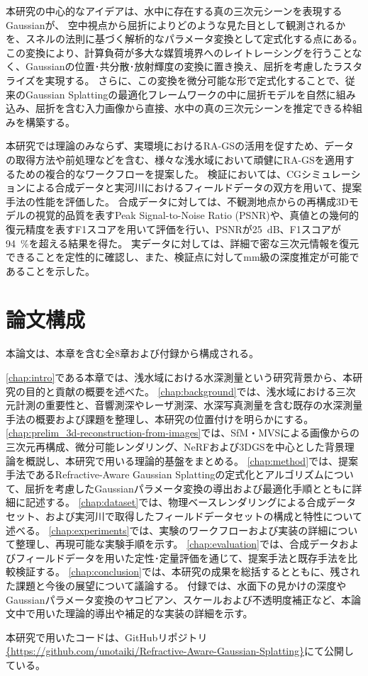 本研究の中心的なアイデアは、水中に存在する真の三次元シーンを表現するGaussianが、
空中視点から屈折によりどのような見た目として観測されるかを、スネルの法則に基づく解析的なパラメータ変換として定式化する点にある。
この変換により、計算負荷が多大な媒質境界へのレイトレーシングを行うことなく、Gaussianの位置･共分散･放射輝度の変換に置き換え、屈折を考慮したラスタライズを実現する。
さらに、この変換を微分可能な形で定式化することで、従来のGaussian Splattingの最適化フレームワークの中に屈折モデルを自然に組み込み、屈折を含む入力画像から直接、水中の真の三次元シーンを推定できる枠組みを構築する。

本研究では理論のみならず、実環境におけるRA-GSの活用を促すため、データの取得方法や前処理などを含む、様々な浅水域において頑健にRA-GSを適用するための複合的なワークフローを提案した。
検証においては、CGシミュレーションによる合成データと実河川におけるフィールドデータの双方を用いて、提案手法の性能を評価した。
合成データに対しては、不観測地点からの再構成3Dモデルの視覚的品質を表すPeak Signal-to-Noise Ratio (PSNR)や、真値との幾何的復元精度を表すF1スコアを用いて評価を行い、PSNRが\qty{25}{dB}、F1スコアが\SI{94}{\percent}を超える結果を得た。
実データに対しては、詳細で密な三次元情報を復元できることを定性的に確認し、また、検証点に対してmm級の深度推定が可能であることを示した。

\section{論文構成}\label{sec:intro-structure}
本論文は、本章を含む全8章および付録から構成される。

\cref{chap:intro}である本章では、浅水域における水深測量という研究背景から、本研究の目的と貢献の概要を述べた。
\cref{chap:background}では、浅水域における三次元計測の重要性と、音響測深やレーザ測深、水深写真測量を含む既存の水深測量手法の概要および課題を整理し、本研究の位置付けを明らかにする。
\cref{chap:prelim_3d-reconstruction-from-images}では、SfM・MVSによる画像からの三次元再構成、微分可能レンダリング、NeRFおよび3DGSを中心とした背景理論を概説し、本研究で用いる理論的基盤をまとめる。
\cref{chap:method}では、提案手法であるRefractive-Aware Gaussian Splattingの定式化とアルゴリズムについて、屈折を考慮したGaussianパラメータ変換の導出および最適化手順とともに詳細に記述する。
\cref{chap:dataset}では、物理ベースレンダリングによる合成データセット、および実河川で取得したフィールドデータセットの構成と特性について述べる。
\cref{chap:experiments}では、実験のワークフローおよび実装の詳細について整理し、再現可能な実験手順を示す。
\cref{chap:evaluation}では、合成データおよびフィールドデータを用いた定性･定量評価を通じて、提案手法と既存手法を比較検証する。
\cref{chap:conclusion}では、本研究の成果を総括するとともに、残された課題と今後の展望について議論する。
付録では、水面下の見かけの深度やGaussianパラメータ変換のヤコビアン、スケールおよび不透明度補正など、本論文中で用いた理論的導出や補足的な実装の詳細を示す。

本研究で用いたコードは、GitHubリポジトリ\url{{https://github.com/unotaiki/Refractive-Aware-Gaussian-Splatting}}にて公開している。

